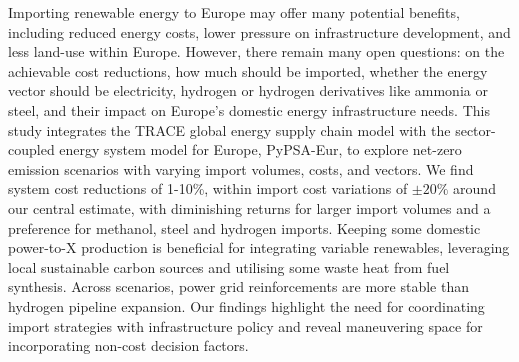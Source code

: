 
Importing renewable energy to Europe may offer many potential benefits,
including reduced energy costs, lower pressure on infrastructure development,
and less land-use within Europe.
However, there remain many open questions: on the achievable cost reductions,
how much should be imported, whether the energy vector should be electricity,
hydrogen or hydrogen derivatives like ammonia or steel, and their impact on
Europe's domestic energy infrastructure needs.
This study integrates the TRACE global energy supply chain model with the
sector-coupled energy system model for Europe, PyPSA-Eur, to explore net-zero
emission scenarios with varying import volumes, costs, and vectors.
We find system cost reductions of 1-10\%, within import cost variations of
$\pm20\%$ around our central estimate, with diminishing returns for larger
import volumes and a preference for methanol, steel and hydrogen imports.
Keeping some domestic power-to-X production is beneficial for integrating
variable renewables, leveraging local sustainable carbon sources and utilising
some waste heat from fuel synthesis. Across scenarios, power grid reinforcements
are more stable than hydrogen pipeline expansion.
Our findings highlight the need for coordinating import strategies with
infrastructure policy and reveal maneuvering space for incorporating non-cost
decision factors.
